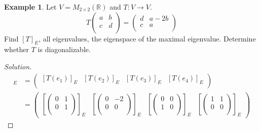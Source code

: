 \documentclass[fleqn, a4paper, 12pt]{article}
\theoremstyle{definition}
\newtheorem{example}{Example}
\theoremstyle{theorem}
\newenvironment{solution}
{\begin{proof}[Solution]\let\qed\relax}
	{\end{proof}}
\begin{document}
\begin{example}
	Let $V = M_{2 \times 2} (\mathbb{R})$ and $T : V \to V$.
	\begin{equation*}
		T 
			\begin{pmatrix}
				a & b\\
				c & d\\
			\end{pmatrix}
		=
			\begin{pmatrix}
				d & a - 2b\\
				c & a\\
			\end{pmatrix}
	\end{equation*}
	Find $[T]_E$, all eigenvalues, the eigenspace of the maximal eigenvalue. Determine whether $T$ is diagonalizable. 
\end{example}

\begin{solution}
	\begin{align*}
		[T]_E &= 
			\begin{pmatrix}
				[T(e_1)]_E & [T(e_2)]_E & [T(e_3)]_E & [T(e_4)]_E\\
			\end{pmatrix}\\
		&= 
			\begin{pmatrix}
				\left[
					\begin{pmatrix}
						0 & 1\\
						0 & 1\\
					\end{pmatrix}
				\right]_E
				&
				\left[
					\begin{pmatrix}
						0 & -2\\
						0 & 0\\
					\end{pmatrix}
				\right]_E
				&
				\left[
					\begin{pmatrix}
						0 & 0\\
						1 & 0\\
					\end{pmatrix}
				\right]_E
				&
				\left[
					\begin{pmatrix}
						1 & 1\\
						0 & 0\\
					\end{pmatrix}
				\right]_E
			\end{pmatrix}
	\end{align*}
\end{solution}
\end{document}
